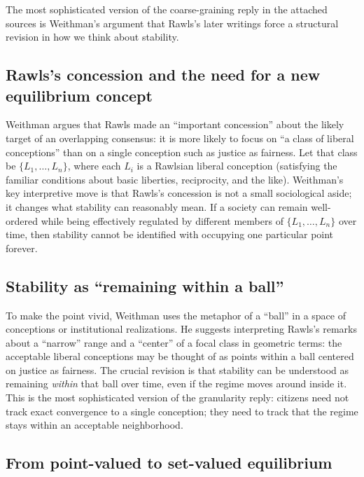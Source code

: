 \documentclass[12pt]{report}
\begin{document}
The most sophisticated version of the coarse-graining reply in the attached sources is Weithman’s argument that Rawls’s later writings force a structural revision in how we think about stability.

\subsection{Rawls’s concession and the need for a new equilibrium concept}

Weithman argues that Rawls made an ``important concession'' about the likely target of an overlapping consensus: it is more likely to focus on ``a class of liberal conceptions'' than on a single conception such as justice as fairness. \parencite[p.~205]{Weithman2023FixedPoints} Let that class be $\{L_{1},\ldots,L_{n}\}$, where each $L_{i}$ is a Rawlsian liberal conception (satisfying the familiar conditions about basic liberties, reciprocity, and the like). \parencite[p.~205]{Weithman2023FixedPoints} Weithman’s key interpretive move is that Rawls’s concession is not a small sociological aside; it changes what stability can reasonably mean. If a society can remain well-ordered while being effectively regulated by different members of $\{L_{1},\ldots,L_{n}\}$ over time, then stability cannot be identified with occupying one particular point forever. \parencite[pp.~205--206]{Weithman2023FixedPoints}

\subsection{Stability as ``remaining within a ball''}

To make the point vivid, Weithman uses the metaphor of a ``ball'' in a space of conceptions or institutional realizations. He suggests interpreting Rawls’s remarks about a ``narrow'' range and a ``center'' of a focal class in geometric terms: the acceptable liberal conceptions may be thought of as points within a ball centered on justice as fairness. \parencite[p.~205]{Weithman2023FixedPoints} The crucial revision is that stability can be understood as remaining \emph{within} that ball over time, even if the regime moves around inside it. \parencite[p.~205]{Weithman2023FixedPoints} This is the most sophisticated version of the granularity reply: citizens need not track exact convergence to a single conception; they need to track that the regime stays within an acceptable neighborhood.

\subsection{From point-valued to set-valued equilibrium}
\end{document}
